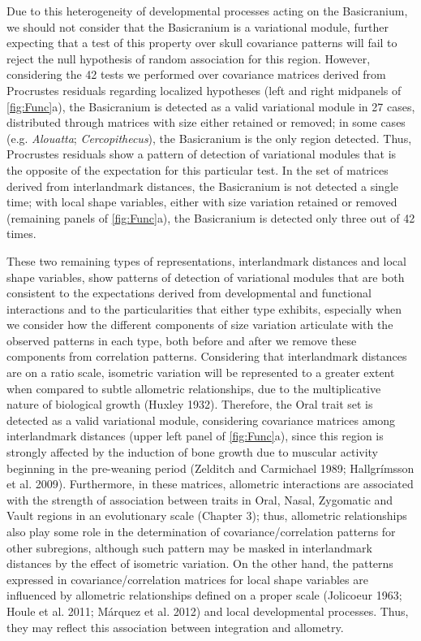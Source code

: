 \documentclass[12pt,]{article}
\begin{document}
Due to this heterogeneity of developmental processes acting on the
Basicranium, we should not consider that the Basicranium is a
variational module, further expecting that a test of this property over
skull covariance patterns will fail to reject the null hypothesis of
random association for this region. However, considering the 42 tests we
performed over covariance matrices derived from Procrustes residuals
regarding localized hypotheses (left and right midpanels of
\autoref{fig:Func}a), the Basicranium is detected as a valid variational
module in 27 cases, distributed through matrices with size either
retained or removed; in some cases (e.g. \emph{Alouatta};
\emph{Cercopithecus}), the Basicranium is the only region detected.
Thus, Procrustes residuals show a pattern of detection of variational
modules that is the opposite of the expectation for this particular
test. In the set of matrices derived from interlandmark distances, the
Basicranium is not detected a single time; with local shape variables,
either with size variation retained or removed (remaining panels of
\autoref{fig:Func}a), the Basicranium is detected only three out of 42
times.

These two remaining types of representations, interlandmark distances
and local shape variables, show patterns of detection of variational
modules that are both consistent to the expectations derived from
developmental and functional interactions and to the particularities
that either type exhibits, especially when we consider how the different
components of size variation articulate with the observed patterns in
each type, both before and after we remove these components from
correlation patterns. Considering that interlandmark distances are on a
ratio scale, isometric variation will be represented to a greater extent
when compared to subtle allometric relationships, due to the
multiplicative nature of biological growth (Huxley 1932). Therefore, the
Oral trait set is detected as a valid variational module, considering
covariance matrices among interlandmark distances (upper left panel of
\autoref{fig:Func}a), since this region is strongly affected by the
induction of bone growth due to muscular activity beginning in the
pre-weaning period (Zelditch and Carmichael 1989; Hallgrímsson et al.
2009). Furthermore, in these matrices, allometric interactions are
associated with the strength of association between traits in Oral,
Nasal, Zygomatic and Vault regions in an evolutionary scale (Chapter 3);
thus, allometric relationships also play some role in the determination
of covariance/correlation patterns for other subregions, although such
pattern may be masked in interlandmark distances by the effect of
isometric variation. On the other hand, the patterns expressed in
covariance/correlation matrices for local shape variables are influenced
by allometric relationships defined on a proper scale (Jolicoeur 1963;
Houle et al. 2011; Márquez et al. 2012) and local developmental
processes. Thus, they may reflect this association between integration
and allometry.
\end{document}
